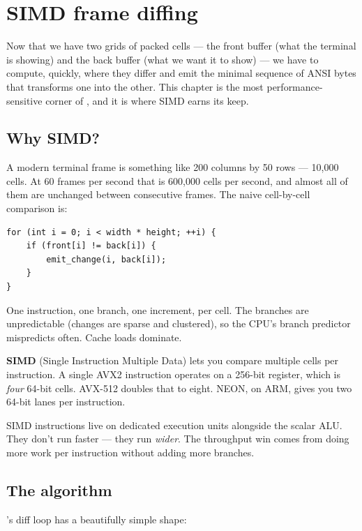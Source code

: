 \chapter{SIMD frame diffing}
\label{ch:simd}

Now that we have two grids of packed cells --- the front buffer (what
the terminal is showing) and the back buffer (what we want it to show)
--- we have to compute, quickly, where they differ and emit the
minimal sequence of ANSI bytes that transforms one into the other.
This chapter is the most performance-sensitive corner of \maya{}, and
it is where SIMD earns its keep.

\section{Why SIMD?}

A modern terminal frame is something like 200 columns by 50 rows ---
10,000 cells. At 60 frames per second that is 600,000 cells per
second, and almost all of them are unchanged between consecutive
frames. The naive cell-by-cell comparison is:

\begin{lstlisting}
for (int i = 0; i < width * height; ++i) {
    if (front[i] != back[i]) {
        emit_change(i, back[i]);
    }
}
\end{lstlisting}

One  instruction, one branch, one increment, per cell. The
branches are unpredictable (changes are sparse and clustered), so the
CPU's branch predictor mispredicts often. Cache loads dominate.

\textbf{SIMD} (Single Instruction Multiple Data) lets you compare
multiple cells per instruction. A single AVX2 instruction operates on
a 256-bit register, which is \emph{four} 64-bit cells. AVX-512 doubles
that to eight. NEON, on ARM, gives you two 64-bit lanes per
instruction.

\begin{theory}
SIMD instructions live on dedicated execution units alongside the
scalar ALU. They don't run faster --- they run \emph{wider}. The
throughput win comes from doing more work per instruction without
adding more branches.
\end{theory}

\section{The algorithm}

\maya{}'s diff loop has a beautifully simple shape:

